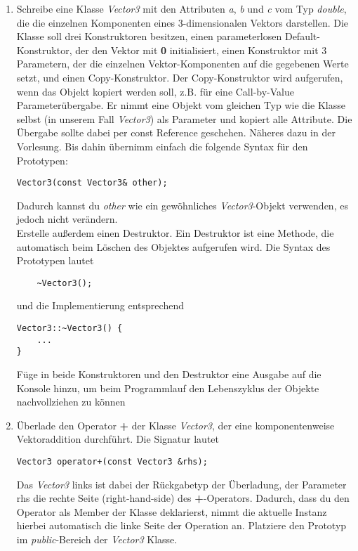 \documentclass[
  accentcolor=tud1c,	%
  colorbacktitle,		%
  inverttitle,			%
  german,				%
  twoside
]{tudexercise}
\begin{document}
\begin{enumerate}
\item 
Schreibe eine Klasse \emph{Vector3} mit den Attributen \emph{a}, \emph{b} und \emph{c} vom Typ \emph{double}, die die einzelnen Komponenten eines 3-dimensionalen Vektors darstellen.
Die Klasse soll drei Konstruktoren besitzen, einen parameterlosen Default-Konstruktor, der den Vektor mit \textbf{0} initialisiert, einen Konstruktor mit 3 Parametern, der die einzelnen Vektor-Komponenten auf die gegebenen Werte setzt, und einen Copy-Konstruktor.
Der Copy-Konstruktor wird aufgerufen, wenn das Objekt kopiert werden soll, z.B. für eine Call-by-Value Parameterübergabe.
Er nimmt eine Objekt vom gleichen Typ wie die Klasse selbst (in unserem Fall \emph{Vector3}) als Parameter und kopiert alle Attribute.
Die Übergabe sollte dabei per const Reference geschehen.
Näheres dazu in der Vorlesung.
Bis dahin übernimm einfach die folgende Syntax für den Prototypen:
\begin{lstlisting}
Vector3(const Vector3& other);
\end{lstlisting} 

Dadurch kannst du \emph{other} wie ein gewöhnliches \emph{Vector3}-Objekt verwenden, es jedoch nicht verändern. \\

Erstelle außerdem einen Destruktor.
Ein Destruktor ist eine Methode, die automatisch beim Löschen des Objektes aufgerufen wird. Die Syntax des Prototypen lautet
\begin{lstlisting}
	~Vector3();
\end{lstlisting} 

und die Implementierung entsprechend
\begin{lstlisting}
Vector3::~Vector3() {
	...
}
\end{lstlisting} 

Füge in beide Konstruktoren und den Destruktor eine Ausgabe auf die Konsole hinzu, um beim Programmlauf den Lebenszyklus der Objekte nachvollziehen zu können

\item
Überlade den Operator \textbf{+} der Klasse \emph{Vector3}, der eine komponentenweise Vektoraddition durchführt.
Die Signatur lautet
\begin{lstlisting}
Vector3 operator+(const Vector3 &rhs);
\end{lstlisting}
Das \emph{Vector3} links ist dabei der Rückgabetyp der Überladung, der Parameter rhs die rechte Seite (\glqq right-hand-side\grqq{}) des \textbf{+}-Operators.
Dadurch, dass du den Operator als Member der Klasse deklarierst, nimmt die aktuelle Instanz hierbei automatisch die linke Seite der Operation an.
Platziere den Prototyp im \emph{public}-Bereich der \emph{Vector3} Klasse.


\end{enumerate}
\end{document}
